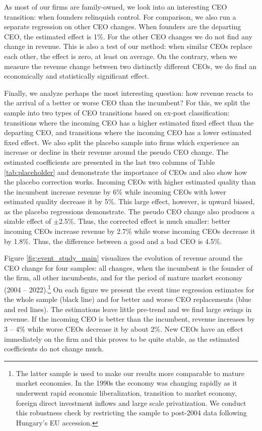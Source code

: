 \documentclass[11pt,a4paper]{article}
\begin{document}
As most of our firms are family-owned, we look into an interesting CEO transition: when founders relinquish control. For comparison, we also run a separate regression on other CEO changes. When founders are the departing CEO, the estimated effect is 1\%. For the other CEO changes we do not find any change in revenue. This is also a test of our method: when similar CEOs replace each other, the effect is zero, at least on average. On the contrary, when we measure the revenue change between two distinctly different CEOs, we do find an economically and statistically significant effect. 



Finally, we analyze perhaps the most interesting question: how revenue reacts to the arrival of a better or worse CEO than the incumbent? For this, we split the sample into two types of CEO transitions based on ex-post classification: transitions where the incoming CEO has a higher estimated fixed effect than the departing CEO, and transitions where the incoming CEO has a lower estimated fixed effect. We also split the placebo sample into firms which experience an increase or decline in their revenue around the pseudo CEO change. The estimated coefficients are presented in the last two columns of Table \ref{tab:placeholder} and demonstrate the importance of CEOs and also show how the placebo correction works. Incoming CEOs with higher estimated quality than the incumbent increase revenue by 6\% while incoming CEOs with lower estimated quality decrease it by 5\%. This large effect, however, is upward biased, as the placebo regressions demonstrate. The pseudo CEO change also produces a sizable effect of $\pm$2.5\%. Thus, the corrected effect is much smaller: better incoming CEOs increase revenue by 2.7\% while worse incoming CEOs decrease it by 1.8\%. Thus, the difference between a good and a bad CEO is 4.5\%. 

Figure \ref{fig:event_study_main} visualizes the evolution of revenue around the CEO change for four samples: all changes, when the incumbent is the founder of the firm, all other incumbents, and for the period of mature market economy (2004 -- 2022).\footnote{The latter sample is used to make our results more comparable to mature market economies. In the 1990s the economy was changing rapidly as it underwent rapid economic liberalization, transition to market economy, foreign direct investment inflows and large scale privatization. We conduct this robustness check by restricting the sample to post-2004 data following Hungary's EU accession.} On each figure we present the event time regression estimates for the whole sample (black line) and for better and worse CEO replacements (blue and red lines). The estimations leave little pre-trend and we find large swings in revenue. If the incoming CEO is better than the incumbent, revenue increases by 3 -- 4\% while worse CEOs decrease it by about 2\%. New CEOs have an effect immediately on the firm and this proves to be quite stable, as the estimated coefficients do not change much.  
\end{document}
